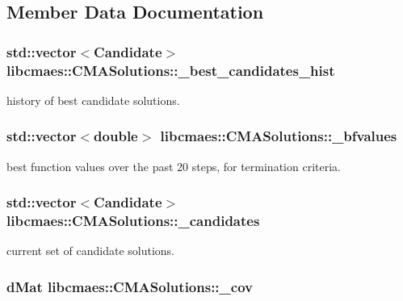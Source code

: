 \subsection{Member Data Documentation}
\hypertarget{classlibcmaes_1_1CMASolutions_a49e8d5096b2342777b494c613f930031}{
\subsubsection[{\-\_\-best\-\_\-candidates\-\_\-hist}]{\setlength{\rightskip}{0pt plus 5cm}std\-::vector$<${\bf Candidate}$>$ libcmaes\-::\-C\-M\-A\-Solutions\-::\-\_\-best\-\_\-candidates\-\_\-hist}}\label{classlibcmaes_1_1CMASolutions_a49e8d5096b2342777b494c613f930031}
history of best candidate solutions. \hypertarget{classlibcmaes_1_1CMASolutions_a2ef75688ae95caea23de230f0bebc55a}{
\subsubsection[{\-\_\-bfvalues}]{\setlength{\rightskip}{0pt plus 5cm}std\-::vector$<$double$>$ libcmaes\-::\-C\-M\-A\-Solutions\-::\-\_\-bfvalues}}\label{classlibcmaes_1_1CMASolutions_a2ef75688ae95caea23de230f0bebc55a}
best function values over the past 20 steps, for termination criteria. \hypertarget{classlibcmaes_1_1CMASolutions_a00270b99b2b65d9f45d985e4c2802150}{
\subsubsection[{\-\_\-candidates}]{\setlength{\rightskip}{0pt plus 5cm}std\-::vector$<${\bf Candidate}$>$ libcmaes\-::\-C\-M\-A\-Solutions\-::\-\_\-candidates}}\label{classlibcmaes_1_1CMASolutions_a00270b99b2b65d9f45d985e4c2802150}
current set of candidate solutions. \hypertarget{classlibcmaes_1_1CMASolutions_aa3699ac23ef9be0bc60be0a6417891fe}{
\subsubsection[{\-\_\-cov}]{\setlength{\rightskip}{0pt plus 5cm}d\-Mat libcmaes\-::\-C\-M\-A\-Solutions\-::\-\_\-cov}}\label{classlibcmaes_1_1CMASolutions_aa3699ac23ef9be0bc60be0a6417891fe}
